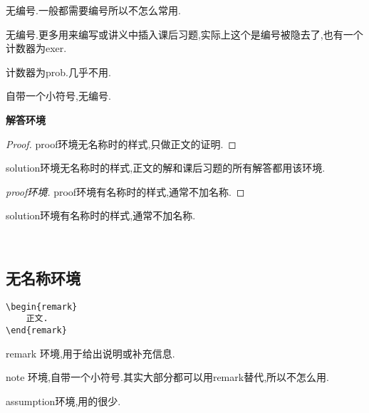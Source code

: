 \documentclass[lang=cn,12pt,scheme=chinese,mode=simple,black]{elegantbook}
\begin{document}
\begin{example*}[example*环境]
    无编号.一般都需要编号所以不怎么常用.
\end{example*}

\begin{exercise}[exercise环境]
    无编号.更多用来编写或讲义中插入课后习题,实际上这个是编号被隐去了,也有一个计数器为exer.
\end{exercise}

\begin{problem}[problem环境]
    计数器为prob.几乎不用.
\end{problem}

\begin{homework}[homework名称]
    自带一个小符号,无编号.
\end{homework}



\textbf{解答环境}
\begin{proof}
    proof环境无名称时的样式,只做正文的证明.
\end{proof}
\begin{solution}
    solution环境无名称时的样式,正文的解和课后习题的所有解答都用该环境.
\end{solution}


\begin{proof}[proof环境]
    proof环境有名称时的样式,通常不加名称.
\end{proof}
\begin{solution}[solution环境]
    solution环境有名称时的样式,通常不加名称.
\end{solution}\
\




\subsection{无名称环境}
\begin{lstlisting}
\begin{remark}
    正文.
\end{remark}
\end{lstlisting}
\begin{remark}
    remark 环境,用于给出说明或补充信息.
\end{remark}
\begin{note}[没有标题]
    note 环境,自带一个小符号.其实大部分都可以用remark替代,所以不怎么用.
\end{note}

\begin{assumption}
    assumption环境,用的很少.
\end{assumption}
\end{document}
